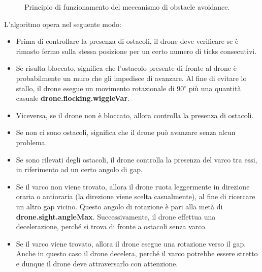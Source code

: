 \begin{figure}[H] 
    \captionsetup{justification=centering, margin=2cm, font=footnotesize}
    \begin{center}
    \end{center}
    \caption{Principio di funzionamento del meccanismo di obstacle avoidance.}
    \label{obstacle_avoidance}
\end{figure}

L’algoritmo opera nel seguente modo:
\begin{itemize}
	\item Prima di controllare la presenza di ostacoli, il drone deve verificare se è rimasto fermo sulla stessa posizione per un certo numero di ticks consecutivi.
	\item Se risulta bloccato, significa che l’ostacolo presente di fronte al drone è probabilmente un muro che gli impedisce di avanzare. 
    Al fine di evitare lo stallo, il drone esegue un movimento rotazionale di 90$^{\circ}$ più una quantità casuale \textbf{drone.flocking.wiggleVar}.
	\item Viceversa, se il drone non è bloccato, allora controlla la presenza di ostacoli.
	\item Se non ci sono ostacoli, significa che il drone può avanzare senza alcun problema.
	\item Se sono rilevati degli ostacoli, il drone controlla la presenza del varco tra essi, in riferimento ad un certo angolo di gap.
	\item Se il varco non viene trovato, allora il drone ruota leggermente in direzione oraria o antioraria (la direzione viene scelta casualmente), al fine di ricercare un altro gap vicino. 
    Questo angolo di rotazione è pari alla metà di \textbf{drone.sight.angleMax}. 
    Successivamente, il drone effettua una decelerazione, perché si trova di fronte a ostacoli senza varco.
	\item Se il varco viene trovato, allora il drone esegue una rotazione verso il gap. 
    Anche in questo caso il drone decelera, perché il varco potrebbe essere stretto e dunque il drone deve attraversarlo con attenzione.
\end {itemize}

